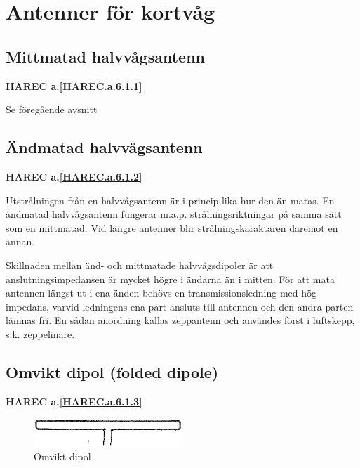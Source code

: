 \section{Antenner för kortvåg}

\subsection{Mittmatad halvvågsantenn}
\textbf{
HAREC a.\ref{HAREC.a.6.1.1}\label{myHAREC.a.6.1.1}
}

Se föregående avsnitt

\subsection{Ändmatad halvvågsantenn}
\textbf{
HAREC a.\ref{HAREC.a.6.1.2}\label{myHAREC.a.6.1.2}
}

Utstrålningen från en halvvågsantenn är i princip lika hur den än
matas. En ändmatad halvvågsantenn fungerar m.a.p. strålningsriktningar
på samma sätt som en mittmatad. Vid längre antenner blir
strålningskaraktären däremot en annan.

Skillnaden mellan änd- och mittmatade halvvågsdipoler är att
anslutningsimpedansen är mycket högre i ändarna än i mitten. För att
mata antennen längst ut i ena änden behövs en transmissionsledning med
hög impedans, varvid ledningens ena part ansluts till antennen och den
andra parten lämnas fri. En sådan anordning kallas zeppantenn och
användes först i luftskepp, s.k. zeppelinare.


\subsection{Omvikt dipol (folded dipole)}
\textbf{
HAREC a.\ref{HAREC.a.6.1.3}\label{myHAREC.a.6.1.3}
}

\begin{figure}
  \includegraphics[width=0.5\textwidth]{images/bild_2_6-12.png}
  \caption{Omvikt dipol}
  \label{fig:bildII6-12}
\end{figure}

